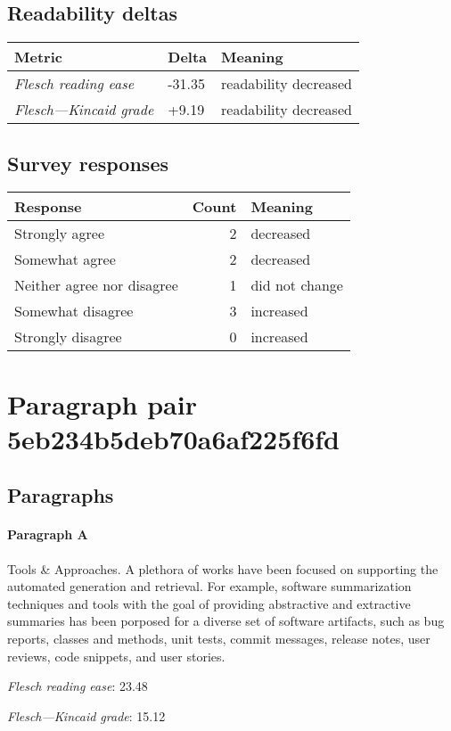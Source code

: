 \subsection{Readability deltas}

\begin{tabular}{lll}
\toprule
               \textbf{Metric} & \textbf{Delta} &       \textbf{Meaning} \\
\midrule
    \emph{Flesch reading ease} &         -31.35 &  readability decreased \\
 \emph{Flesch---Kincaid grade} &          +9.19 &  readability decreased \\
\bottomrule
\end{tabular}

\subsection{Survey responses}
\begin{tabular}{lrl}
\toprule
          \textbf{Response} &  \textbf{Count} & \textbf{Meaning} \\
\midrule
             Strongly agree &               2 &        decreased \\
             Somewhat agree &               2 &        decreased \\
 Neither agree nor disagree &               1 &   did not change \\
          Somewhat disagree &               3 &        increased \\
          Strongly disagree &               0 &        increased \\
\bottomrule
\end{tabular}

\section{Paragraph pair 5eb234b5deb70a6af225f6fd}
\subsection{Paragraphs}
\paragraph{Paragraph A}
Tools \& Approaches. A plethora of works have been focused on supporting the automated generation and retrieval. For example, software summarization techniques and tools with the goal of providing abstractive and extractive summaries has been porposed for a diverse set of software artifacts, such as bug reports, classes and methods, unit tests, commit messages, release notes, user reviews, code snippets, and user stories.\par\medskip
\emph{Flesch reading ease}: 23.48\par
\emph{Flesch---Kincaid grade}: 15.12

